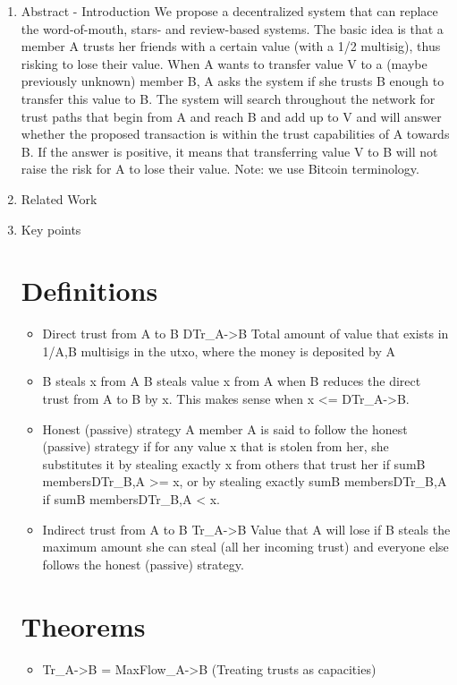\documentclass[11pt]{article}
\begin{document}
\begin{enumerate}
  \item Abstract - Introduction
  We propose a decentralized system that can replace the word-of-mouth, stars- and review-based systems.
  The basic idea is that a member A trusts her friends with a certain value (with a 1/2 multisig), thus
  risking to lose their value. When A wants to transfer value V to a (maybe previously unknown) member B,
  A asks the system if she trusts B enough to transfer this value to B. The system will search throughout
  the network for trust paths that begin from A and reach B and add up to V and will answer whether the
  proposed transaction is within the trust capabilities of A towards B. If the answer is positive, it means
  that transferring value V to B will not raise the risk for A to lose their value.
  Note: we use Bitcoin terminology.


  \item Related Work

  \item Key points
  \section*{Definitions}
    \begin{itemize}
      \item Direct trust from A to B DTr_{A->B}
      Total amount of value that exists in 1/{A,B} multisigs in the utxo, where the money is deposited by A
      \item B steals x from A
      B steals value x from A when B reduces the direct trust from A to B by x. This makes sense when 
      x <= DTr_{A->B}.
      \item Honest (passive) strategy
      A member A is said to follow the honest (passive) strategy if for any value x that is stolen from her, she
      substitutes it by stealing exactly x from others that trust her if sum{B \in members}{DTr_{B,A}} >= x,
      or by stealing exactly sum{B \in members}{DTr_{B,A}} if sum{B \in members}{DTr_{B,A}} < x.
      \item Indirect trust from A to B Tr_{A->B}
      Value that A will lose if B steals the maximum amount she can steal (all her incoming trust) and everyone
      else follows the honest (passive) strategy.
    \end{itemize}
  \section*{Theorems}
    \begin{itemize}
    \item Tr_{A->B} = MaxFlow_{A->B} (Treating trusts as capacities)
    

\end{itemize}
\end{enumerate}
\end{document}

